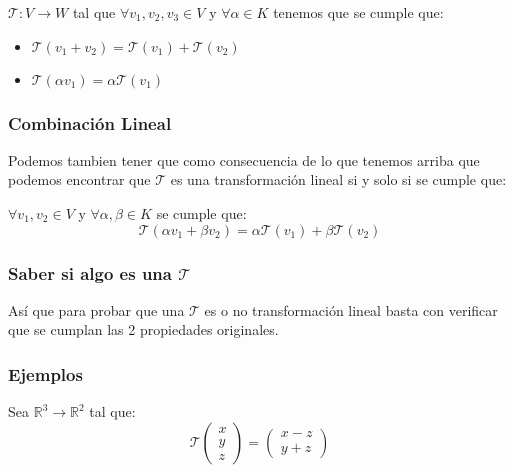\documentclass[12pt]{report}                                %
\begin{document}
        $\mathscr{T}: V \to W $ tal que $\forall v_1, v_2, v_3 \in V $ y $\forall \alpha \in K$
        tenemos que se cumple que:

        \begin{itemize}
            \item $\mathscr{T} (v_1 + v_2) = \mathscr{T}(v_1) + \mathscr{T}(v_2)$
            \item $\mathscr{T} (\alpha v_1) = \alpha \mathscr{T}(v_1)$ 
        \end{itemize}

        \subsubsection{Combinación Lineal}
        Podemos tambien tener que como consecuencia de lo que tenemos arriba que podemos
        encontrar que $\mathscr{T}$ es una transformación lineal si y solo si se cumple que:

        $\forall v_1, v_2 \in V$ y $\forall \alpha, \beta \in K$ se cumple que:
        \begin{equation}
            \mathscr{T}(\alpha v_1 + \beta v_2) = \alpha \mathscr{T}(v_1) + \beta \mathscr{T}(v_2)
        \end{equation}

        \subsubsection{Saber si algo es una $\mathscr{T}$}
        Así que para probar que una $\mathscr{T}$ es o no transformación lineal basta con verificar
        que se cumplan las 2 propiedades originales. 

        \clearpage
        \subsubsection{Ejemplos}
            Sea $\mathbb{R}^3 \to \mathbb{R}^2$ tal que:
            \begin{equation*}
                \mathscr{T}\left( \begin{matrix} x\\y\\z \end{matrix} \right) =
                \left( \begin{matrix} x-z\\y+z \end{matrix} \right)
            \end{equation*}
\end{document}
